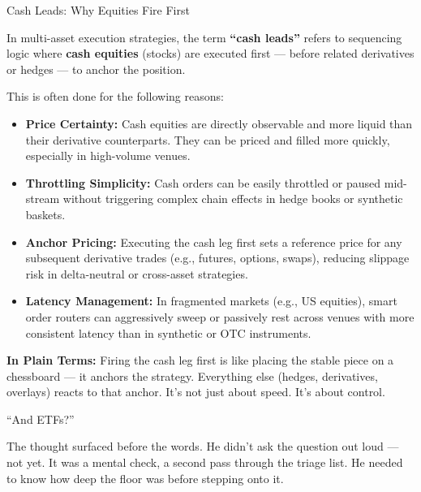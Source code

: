 \begin{TechnicalSidebar}{Cash Leads: Why Equities Fire First}

    In multi-asset execution strategies, the term \textbf{``cash leads''} refers to sequencing logic where 
    \textbf{cash equities} (stocks) are executed first — before related derivatives or hedges — to anchor the position.
    
    \medskip
    
    This is often done for the following reasons:

    \medskip
    
    \begin{itemize}
      \item \textbf{Price Certainty:}  
      Cash equities are directly observable and more liquid than their derivative counterparts. They can be priced and filled more quickly, especially in high-volume venues.
    
      \item \textbf{Throttling Simplicity:}  
      Cash orders can be easily throttled or paused mid-stream without triggering complex chain effects in hedge books or synthetic baskets.
    
      \item \textbf{Anchor Pricing:}  
      Executing the cash leg first sets a reference price for any subsequent derivative trades (e.g., futures, options, swaps), reducing slippage risk in delta-neutral or cross-asset strategies.
    
      \item \textbf{Latency Management:}  
      In fragmented markets (e.g., US equities), smart order routers can aggressively sweep or passively rest across venues with more consistent latency than in synthetic or OTC instruments.
    \end{itemize}
    
    \medskip
    
    \textbf{In Plain Terms:}  
    Firing the cash leg first is like placing the stable piece on a chessboard — it anchors the strategy.  
    Everything else (hedges, derivatives, overlays) reacts to that anchor.  
    It’s not just about speed.  
    It’s about control.
    
\end{TechnicalSidebar}

\medskip


“And ETFs?”

The thought surfaced before the words. He didn’t ask the question out loud — not yet. It was a mental check, a second pass through the triage list. He needed to know how deep the floor was before stepping onto it.

